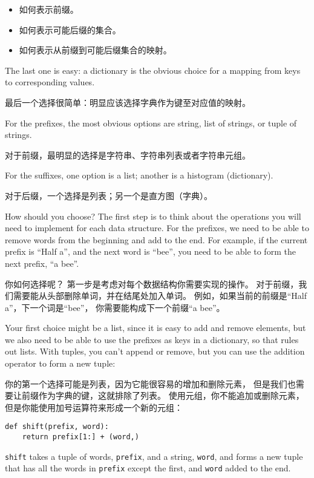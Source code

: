 \begin{itemize}
\item 如何表示前缀。
\item 如何表示可能后缀的集合。
\item 如何表示从前缀到可能后缀集合的映射。
\end{itemize}

The last one is easy: a dictionary is the obvious choice
for a mapping from keys to corresponding values.

最后一个选择很简单：明显应该选择字典作为键至对应值的映射。

For the prefixes, the most obvious options are string,
list of strings, or tuple of strings.

对于前缀，最明显的选择是字符串、字符串列表或者字符串元组。

For the suffixes,
one option is a list; another is a histogram (dictionary).

对于后缀，一个选择是列表；另一个是直方图（字典）。


How should you choose?  The first step is to think about
the operations you will need to implement for each data structure.
For the prefixes, we need to be able to remove words from
the beginning and add to the end.  For example, if the current
prefix is ``Half a'', and the next word is ``bee'', you need
to be able to form the next prefix, ``a bee''.

你如何选择呢？ 第一步是考虑对每个数据结构你需要实现的操作。
对于前缀，我们需要能从头部删除单词，并在结尾处加入单词。
例如，如果当前的前缀是``Half a''，下一个词是``bee''，
你需要能构成下一个前缀``a bee''。

Your first choice might be a list, since it is easy to add
and remove elements, but we also need to be able to use the
prefixes as keys in a dictionary, so that rules out lists.
With tuples, you can't append or remove, but you can use
the addition operator to form a new tuple:

你的第一个选择可能是列表，因为它能很容易的增加和删除元素，
但是我们也需要让前缀作为字典的键，这就排除了列表。
使用元组，你不能追加或删除元素，
但是你能使用加号运算符来形成一个新的元组：

\begin{lstlisting}
def shift(prefix, word):
    return prefix[1:] + (word,)
\end{lstlisting}

%
{\tt shift} takes a tuple of words, {\tt prefix}, and a string,
{\tt word}, and forms a new tuple that has all the words
in {\tt prefix} except the first, and {\tt word} added to
the end.

